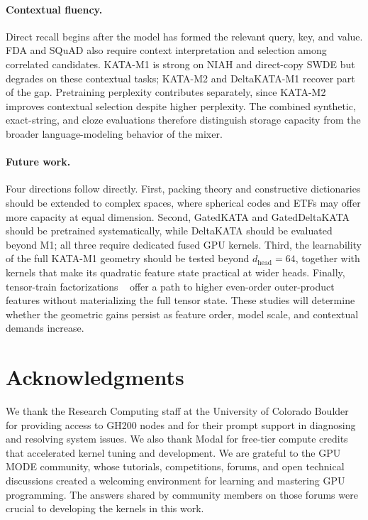 \documentclass{article}
\newcommand{\1}{\bm{1}}
\theoremstyle{definition}
\begin{document}
\paragraph{Contextual fluency.}
Direct recall begins after the model has formed the relevant query, key, and value. FDA and SQuAD
also require context interpretation and selection among correlated candidates. KATA-M1 is strong on
NIAH and direct-copy SWDE but degrades on these contextual tasks; KATA-M2 and DeltaKATA-M1 recover
part of the gap. Pretraining perplexity contributes separately, since KATA-M2 improves contextual
selection despite higher perplexity. The combined synthetic, exact-string, and cloze evaluations
therefore distinguish storage capacity from the broader language-modeling behavior of the mixer.

\paragraph{Future work.}
Four directions follow directly. First, packing theory and constructive dictionaries should be
extended to complex spaces, where spherical codes and ETFs may offer more capacity at equal
dimension. Second, GatedKATA and GatedDeltaKATA should be pretrained systematically, while
DeltaKATA should be evaluated beyond M1; all three require dedicated fused GPU kernels. Third, the
learnability of the full KATA-M1 geometry should be tested beyond $d_\text{head}=64$, together with kernels that make its quadratic
feature state practical at wider heads. Finally, tensor-train factorizations
~\citep{oseledets11tt} offer a path to higher even-order outer-product features without materializing
the full tensor state. These studies will determine whether the geometric gains persist as feature
order, model scale, and contextual demands increase.



\section*{Acknowledgments}
We thank the Research Computing staff at the University of Colorado Boulder for providing access to
GH200 nodes and for their prompt support in diagnosing and resolving system issues. We also thank
Modal for free-tier compute credits that accelerated kernel tuning and development. We are grateful
to the GPU MODE community, whose tutorials, competitions, forums, and open technical discussions
created a welcoming environment for learning and mastering GPU programming. The answers shared by
community members on those forums were crucial to developing the kernels in this work.
\end{document}
